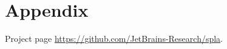 \section{Appendix}

Project page \href{https://github.com/JetBrains-Research/spla}{https://github.com/JetBrains-Research/spla}.